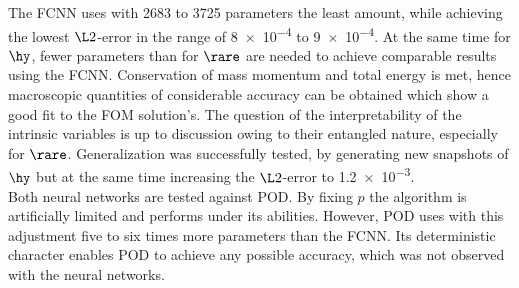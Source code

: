 The FCNN uses with 2683 to 3725 parameters the least amount, while achieving the lowest \(\L2\)-error in the range of \num{8e-4} to \num{9e-4}. At the same time for \(\hy\), fewer parameters than for \(\rare\) are needed to achieve comparable results using the FCNN. Conservation of mass momentum and total energy is met, hence macroscopic quantities of considerable accuracy can be obtained which show a good fit to the FOM solution's. The question of the interpretability of the intrinsic variables is up to discussion owing to their entangled nature, especially for \(\rare\). Generalization was successfully tested, by generating new snapshots of \(\hy\) but at the same time increasing the \(\L2\)-error to \num{1.2e-3}.\\
Both neural networks are tested against POD. By fixing \(p\) the algorithm is artificially limited and performs under its abilities. However, POD uses with this adjustment five to six times more parameters than the FCNN. Its deterministic character enables POD to achieve any possible accuracy, which was not observed with the neural networks.    

